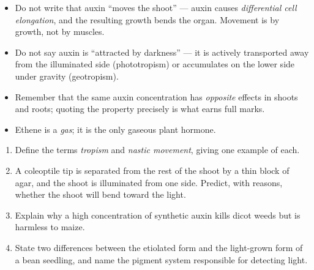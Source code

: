 \documentclass[11pt]{article}
\begin{document}
\begin{attention}
\begin{itemize}
\item Do not write that auxin ``moves the shoot'' — auxin causes \emph{differential cell elongation}, and the resulting growth bends the organ. Movement is by growth, not by muscles.
\item Do not say auxin is ``attracted by darkness'' — it is actively transported away from the illuminated side (phototropism) or accumulates on the lower side under gravity (geotropism).
\item Remember that the same auxin concentration has \emph{opposite} effects in shoots and roots; quoting the property precisely is what earns full marks.
\item Ethene is a \emph{gas}; it is the only gaseous plant hormone.
\end{itemize}
\end{attention}

\begin{exercice}
\begin{enumerate}
\item Define the terms \emph{tropism} and \emph{nastic movement}, giving one example of each.
\item A coleoptile tip is separated from the rest of the shoot by a thin block of agar, and the shoot is illuminated from one side. Predict, with reasons, whether the shoot will bend toward the light.
\item Explain why a high concentration of synthetic auxin kills dicot weeds but is harmless to maize.
\item State two differences between the etiolated form and the light-grown form of a bean seedling, and name the pigment system responsible for detecting light.
\end{enumerate}
\end{exercice}
\end{document}
